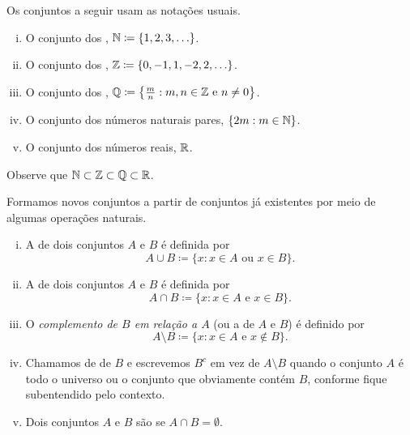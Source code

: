 \begin{example}
Os conjuntos a seguir usam as notações usuais.
\begin{enumerate}[(i)]
\item O conjunto dos \emph{},
${\mathbb{N}} \coloneqq \{ 1, 2, 3, \ldots
\}$.
\item O conjunto dos \emph{},
${\mathbb{Z}} \coloneqq \{ 0, -1, 1, -2, 2, \ldots
\}$.
\item O conjunto dos \emph{},
${\mathbb{Q}} \coloneqq \bigl\{ \frac{m}{n} :  m, n \in {\mathbb{Z}} \text{ e } n \neq 0 \bigr\}$.
\item O conjunto dos números naturais pares, $\{  2m : m \in {\mathbb{N}} \}$.
\item O conjunto dos números reais,
${\mathbb{R}}$.
\end{enumerate}

Observe que ${\mathbb{N}} \subset {\mathbb{Z}} \subset {\mathbb{Q}} \subset {\mathbb{R}}$.
\end{example}

Formamos novos conjuntos a partir de conjuntos já existentes por meio de
algumas operações naturais.

\begin{defn}
\pagebreak[2]
\leavevmode
\begin{enumerate}[(i)]
\item
A \emph{} de dois conjuntos $A$ e $B$ é definida por
\begin{equation*}
A \cup B \coloneqq \{ x : x \in A \text{ ou } x \in B \} .
\end{equation*}
\item
A \emph{} de dois conjuntos $A$ e $B$ é definida por
\begin{equation*}
A \cap B \coloneqq \{ x : x \in A \text{ e } x \in B \} .
\end{equation*}
\item
O \emph{complemento de $B$ em relação a $A$}
(ou a \emph{} de $A$ e $B$) é definido por
\begin{equation*}
A \setminus B \coloneqq \{ x : x \in A \text{ e } x \notin B \} .
\end{equation*}
\item
Chamamos de \emph{} de $B$ e escrevemos $B^c$
 em vez de $A \setminus B$ quando o conjunto $A$ é
todo o universo ou o conjunto que obviamente contém $B$, conforme fique
subentendido pelo contexto.
\item
Dois conjuntos $A$ e $B$ são \emph{} se $A \cap B =
\emptyset$.
\end{enumerate}
\end{defn}

